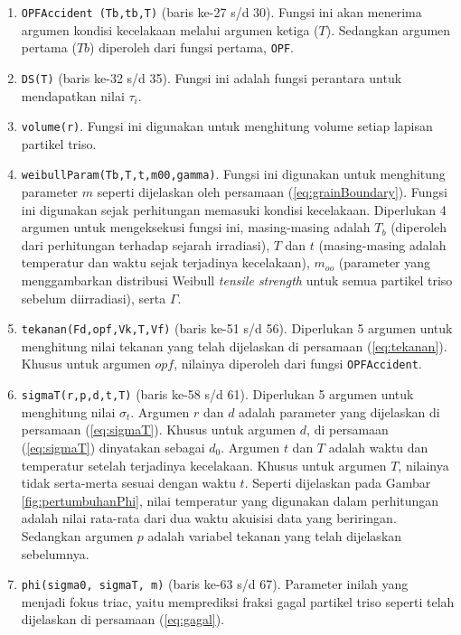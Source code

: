 \documentclass[a4paper,11pt]{report}
\begin{document}
\begin{enumerate}
\item \texttt{OPFAccident (Tb,tb,T)} (baris ke-27 s/d 30). Fungsi ini akan menerima argumen kondisi kecelakaan melalui argumen ketiga ($T$). Sedangkan argumen pertama ($Tb$) diperoleh dari fungsi pertama, \texttt{OPF}.

\item \texttt{DS(T)} (baris ke-32 s/d 35). Fungsi ini adalah fungsi perantara untuk mendapatkan nilai $\tau_i$.

\item \texttt{volume(r)}. Fungsi ini digunakan untuk menghitung volume setiap lapisan partikel triso.

\item \texttt{weibullParam(Tb,T,t,m00,gamma)}. Fungsi ini digunakan untuk menghitung parameter $m$ seperti dijelaskan oleh persamaan (\ref{eq:grainBoundary}). Fungsi ini digunakan sejak perhitungan memasuki kondisi kecelakaan. Diperlukan 4 argumen untuk mengeksekusi fungsi ini, masing-masing adalah $T_b$ (diperoleh dari perhitungan terhadap sejarah irradiasi), $T$ dan $t$ (masing-masing adalah temperatur dan waktu sejak terjadinya kecelakaan), $m_{oo}$ (parameter yang menggambarkan distribusi Weibull \textit{tensile strength} untuk semua partikel triso sebelum diirradiasi), serta $\Gamma$.

\item \texttt{tekanan(Fd,opf,Vk,T,Vf)} (baris ke-51 s/d 56). Diperlukan 5 argumen untuk menghitung nilai tekanan yang telah dijelaskan di persamaan (\ref{eq:tekanan}). Khusus untuk argumen $opf$, nilainya diperoleh dari fungsi \texttt{OPFAccident}.

\item \texttt{sigmaT(r,p,d,t,T)} (baris ke-58 s/d 61). Diperlukan 5 argumen untuk menghitung nilai $\sigma_t$. Argumen $r$ dan $d$ adalah parameter yang dijelaskan di persamaan (\ref{eq:sigmaT}). Khusus untuk argumen $d$, di persamaan (\ref{eq:sigmaT}) dinyatakan sebagai $d_0$. Argumen $t$ dan $T$ adalah waktu dan temperatur setelah terjadinya kecelakaan. Khusus untuk argumen $T$, nilainya tidak serta-merta sesuai dengan waktu $t$. Seperti dijelaskan pada Gambar \ref{fig:pertumbuhanPhi}, nilai temperatur yang digunakan dalam perhitungan adalah nilai rata-rata dari dua waktu akuisisi data yang beriringan. Sedangkan argumen $p$ adalah variabel tekanan yang telah dijelaskan sebelumnya.

\item \texttt{phi(sigma0, sigmaT, m)} (baris ke-63 s/d 67). Parameter inilah yang menjadi fokus triac, yaitu memprediksi fraksi gagal partikel triso seperti telah dijelaskan di persamaan (\ref{eq:gagal}). 
\end{enumerate}
\end{document}
